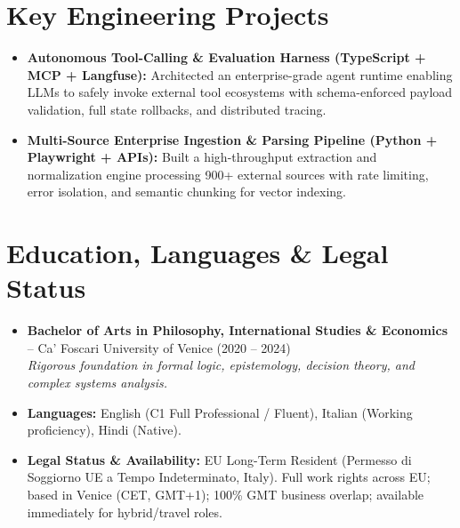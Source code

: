 \documentclass[a4paper,10pt]{article}
\begin{document}
\section{Key Engineering Projects}
\begin{itemize}
  \item \textbf{Autonomous Tool-Calling \& Evaluation Harness (TypeScript + MCP + Langfuse):} Architected an enterprise-grade agent runtime enabling LLMs to safely invoke external tool ecosystems with schema-enforced payload validation, full state rollbacks, and distributed tracing.
  \item \textbf{Multi-Source Enterprise Ingestion \& Parsing Pipeline (Python + Playwright + APIs):} Built a high-throughput extraction and normalization engine processing 900+ external sources with rate limiting, error isolation, and semantic chunking for vector indexing.
\end{itemize}

\section{Education, Languages \& Legal Status}
\begin{itemize}
  \item \textbf{Bachelor of Arts in Philosophy, International Studies \& Economics} -- Ca' Foscari University of Venice (2020 -- 2024) \\
  \textit{Rigorous foundation in formal logic, epistemology, decision theory, and complex systems analysis.}
  \item \textbf{Languages:} English (C1 Full Professional / Fluent), Italian (Working proficiency), Hindi (Native).
  \item \textbf{Legal Status \& Availability:} EU Long-Term Resident (Permesso di Soggiorno UE a Tempo Indeterminato, Italy). Full work rights across EU; based in Venice (CET, GMT+1); 100\% GMT business overlap; available immediately for hybrid/travel roles.
\end{itemize}
\end{document}
